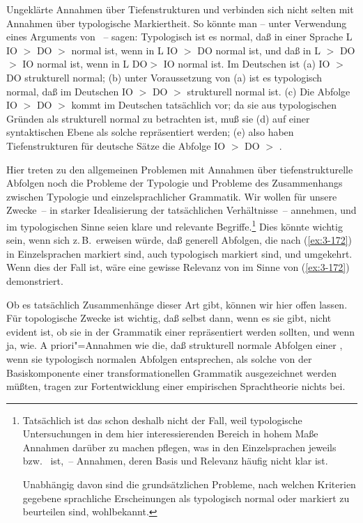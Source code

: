 \documentclass[output=paper]{langsci/langscibook}
\begin{document}
Ungeklärte Annahmen über Tiefenstrukturen und 
verbinden sich nicht selten mit Annahmen über typologische
Markiertheit. So könnte man -- unter Verwendung eines Arguments von \citet{Maling70}~-- sagen: Typologisch ist es normal, daß in einer Sprache L IO $>$ DO $>$  normal ist, wenn in L IO $>$ DO normal ist, und daß in L  $>$ DO $>$ IO normal ist, wenn in L DO$>$ IO normal ist. Im Deutschen ist (a) IO $>$ DO strukturell normal; (b) unter Voraussetzung von (a) ist es typologisch normal, daß im Deutschen IO $>$ DO $>$  strukturell normal ist. (c) Die Abfolge IO $>$ DO $>$  kommt im Deutschen tatsächlich vor; da sie aus typologischen Gründen als strukturell normal zu betrachten ist, muß sie (d) auf einer syntaktischen Ebene als solche repräsentiert werden; (e) also haben Tiefenstrukturen für deutsche Sätze die Abfolge IO $>$ DO $>$ .

Hier treten zu den allgemeinen Problemen mit Annahmen über tiefenstrukturelle Abfolgen noch die
Probleme der Typologie und Probleme des Zusammenhangs zwischen Typologie und einzelsprachlicher
Grammatik. Wir wollen für unsere Zwecke~-- in starker Idealisierung der tatsächlichen
Verhältnisse~-- annehmen,  und  im typologischen Sinne seien klare
und relevante Begriffe.\footnote{\label{fn:3-35}%
  Tatsächlich ist das schon deshalb nicht der Fall,
  weil typologische Untersuchungen in dem hier interessierenden Bereich in hohem Maße Annahmen
  darüber zu machen pflegen, was in den Einzelsprachen jeweils 
  bzw.\  ist,~-- Annahmen, deren Basis und Relevanz häufig nicht klar ist. 

  Unabhängig davon sind die grundsätzlichen Probleme, nach welchen Kriterien gegebene sprachliche
  Erscheinungen als typologisch normal oder markiert zu beurteilen sind, wohlbekannt.%
}
Dies könnte wichtig sein, wenn sich z.\,B.\ erweisen würde, daß generell Abfolgen, die nach
(\ref{ex:3-172}) in Einzelsprachen markiert sind, auch typologisch markiert sind, und
umgekehrt. Wenn dies der Fall ist, wäre eine gewisse Relevanz von  im Sinne von
(\ref{ex:3-172}) demonstriert. 

Ob es tatsächlich Zusammenhänge dieser Art gibt, können wir hier offen
lassen. Für topologische Zwecke ist wichtig, daß selbst dann, wenn es
sie gibt, nicht evident ist, ob sie in der Grammatik einer  repräsentiert werden sollten, und wenn ja, wie. A priori"=Annahmen wie die, daß strukturell normale Abfolgen einer
, wenn sie typologisch normalen Abfolgen entsprechen, als solche von der Basiskomponente einer transformationellen Grammatik ausgezeichnet werden müßten, tragen zur Fortentwicklung einer empirischen Sprachtheorie nichts bei.
\end{document}
